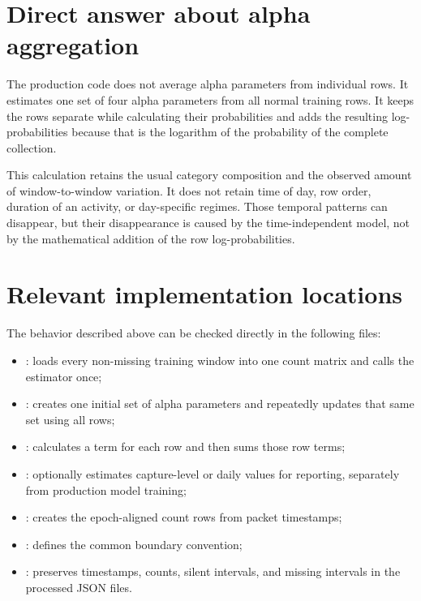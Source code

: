 \documentclass[11pt,a4paper]{article}
\begin{document}
\section{Direct answer about alpha aggregation}

The production code does not average alpha parameters from individual rows.
It estimates one set of four alpha parameters from all normal training rows.
It keeps the rows separate while calculating their probabilities and adds the
resulting log-probabilities because that is the logarithm of the probability of
the complete collection.

This calculation retains the usual category composition and the observed
amount of window-to-window variation.  It does not retain time of day, row
order, duration of an activity, or day-specific regimes.  Those temporal
patterns can disappear, but their disappearance is caused by the
time-independent model, not by the mathematical addition of the row
log-probabilities.

\section{Relevant implementation locations}

The behavior described above can be checked directly in the following files:

\begin{itemize}
  \item {}: loads every non-missing
        training window into one count matrix and calls the estimator once;
  \item {}: creates one initial set of
        alpha parameters and repeatedly updates that same set using all rows;
  \item {}: calculates a term for
        each row and then sums those row terms;
  \item {}: optionally estimates
        capture-level or daily values for reporting, separately from production
        model training;
  \item {}: creates the
        epoch-aligned count rows from packet timestamps;
  \item {}: defines the common
        boundary convention;
  \item {}: preserves timestamps, counts,
        silent intervals, and missing intervals in the processed JSON files.
\end{itemize}
\end{document}
